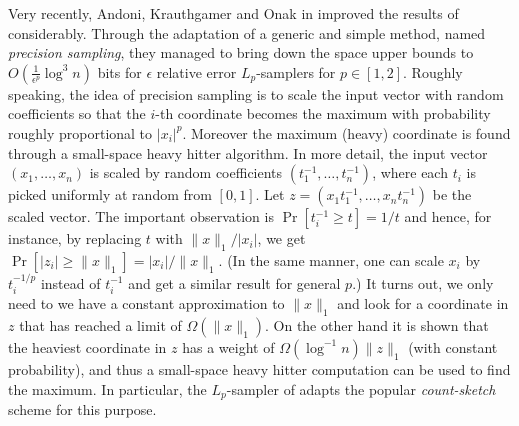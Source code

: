   Very recently, Andoni, Krauthgamer and Onak in %
\cite{AndoniKO10} improved the results of \cite{MonemizadehW10} 
 considerably. Through the adaptation of %
  a generic and simple method, named {\it precision sampling}, they managed
   to bring down the space upper bounds to $O(\frac1{\epsilon^p}\log^3 n)$ bits
   for $\epsilon$ relative error $L_p$-samplers for $p \in [1,2]$. Roughly speaking, the idea of precision
  sampling is to scale the input vector with random coefficients so that the $i$-th coordinate
  becomes the maximum with probability roughly proportional to $|x_i|^p$. Moreover the maximum (heavy)
   coordinate is found through a small-space heavy hitter algorithm. In more detail,
    the input vector $(x_1,\ldots,x_n)$ is scaled 
   by random coefficients $(t_1^{-1},\ldots,t_n^{-1})$, where each $t_i$ is picked uniformly 
   at random from $[0,1]$. Let $z=(x_1t_1^{-1},\ldots,x_nt_n^{-1})$ be the 
   scaled vector. %
 The 
   important observation is $\Pr[t_i^{-1} \ge t] =1/t$ 
   and hence, for instance,  by replacing $t$ with 
   $\|x\|_1/|x_i|$, we get $\Pr[|z_i| \ge \|x\|_1] = |x_i|/\|x\|_1$. (In the
   same manner, one can scale $x_i$ by $t_i^{-1/p}$
   instead of $t_i^{-1}$ and get a similar result for general $p$.) %
It turns out, we only need to we have a constant approximation to
$\|x\|_1$ and look for a coordinate in $z$ that has reached a
   limit of $\Omega(\|x\|_1)$. On the other hand it is shown that the heaviest coordinate in $z$ has
   a weight of $\Omega(\log^{-1}{n})\|z\|_1$ (with constant probability), and thus
   a small-space heavy hitter computation can be used to find the maximum. In particular, 
   the $L_p$-sampler of \cite{AndoniKO10} adapts the
   popular {\it count-sketch} scheme \cite{CharikarCF04} for this purpose.
